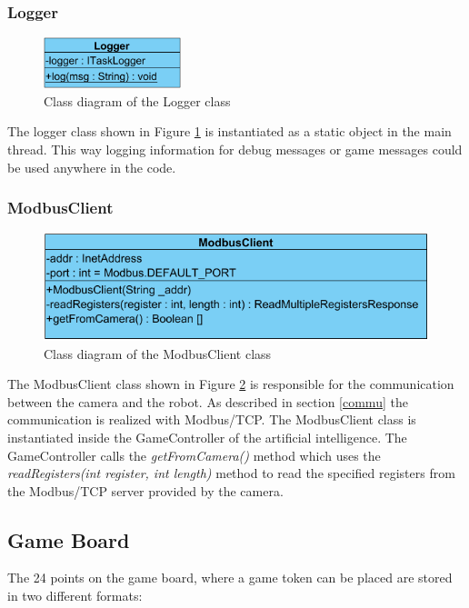 \documentclass[a4paper]{spie}  %
\begin{document}
\begin{large}
\subsubsection{Logger}
\begin{figure}[h]
\includegraphics[width=4cm]{images/class_lo.png}
\centering
\caption{Class diagram of the Logger class}
\label{class_lo}
\end{figure}
The logger class shown in Figure \ref{class_lo} is instantiated as a static object in the main thread. This way logging information for debug messages or game messages could be used anywhere in the code.
\subsubsection{ModbusClient}
\begin{figure}[h]
\includegraphics[width=12cm]{images/class_moCli.png}
\centering
\caption{Class diagram of the ModbusClient class}
\label{class_moCli}
\end{figure}
The ModbusClient class shown in Figure \ref{class_moCli} is responsible for the communication between the camera and the robot. As described in section \ref{commu} the communication is realized with Modbus/TCP. The ModbusClient class is instantiated inside the GameController of the artificial intelligence. The GameController calls the \emph{getFromCamera()} method which uses the \emph{readRegisters(int register, int length)} method to read the specified registers from the Modbus/TCP server provided by the camera. 

\subsection{Game Board}
The 24 points on the game board, where a game token can be placed are stored in two different formats:

\end{large}
\end{document}
